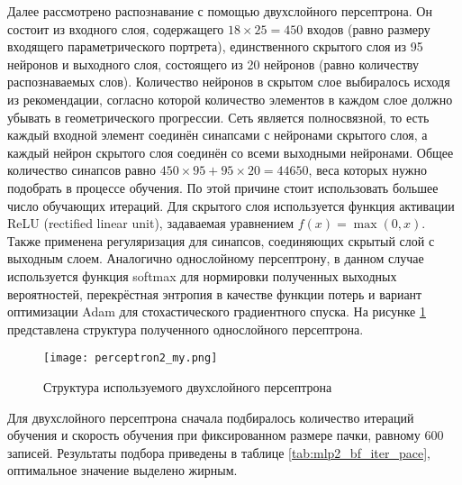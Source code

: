 Далее рассмотрено распознавание с помощью двухслойного персептрона.
Он состоит из входного слоя, содержащего $18 \times 25 = 450$ входов (равно размеру входящего параметрического портрета), единственного скрытого слоя из 95 нейронов и выходного слоя, состоящего из 20 нейронов (равно количеству распознаваемых слов).
Количество нейронов в скрытом слое выбиралось исходя из рекомендации, согласно которой количество элементов в каждом слое должно убывать в геометрического прогрессии.
Сеть является полносвязной, то есть каждый входной элемент соединён синапсами с нейронами скрытого слоя, а каждый нейрон скрытого слоя соединён со всеми выходными нейронами.
Общее количество синапсов равно $450 \times 95 + 95 \times 20 = 44650$, веса которых нужно подобрать в процессе обучения.
По этой причине стоит использовать большее число обучающих итераций.
Для скрытого слоя используется функция активации ReLU (rectified linear unit), задаваемая уравнением $f(x) = \max (0, x)$.
Также применена регуляризация для синапсов, соединяющих скрытый слой с выходным слоем.
Аналогично однослойному персептрону, в данном случае используется функция softmax для нормировки полученных выходных вероятностей, перекрёстная энтропия в качестве функции потерь и вариант оптимизации Adam для стохастического градиентного спуска.
На рисунке \ref{fig:perceptron2_my} представлена структура полученного однослойного персептрона.

\begin{figure}[h]
	\centering
	\texttt{[image: perceptron2\_my.png]}
	\caption{Структура используемого двухслойного персептрона}
	\label{fig:perceptron2_my}
\end{figure}

Для двухслойного персептрона сначала подбиралось количество итераций обучения и скорость обучения при фиксированном размере пачки, равному 600 записей.
Результаты подбора приведены в таблице \ref{tab:mlp2_bf_iter_pace}, оптимальное значение выделено жирным.

